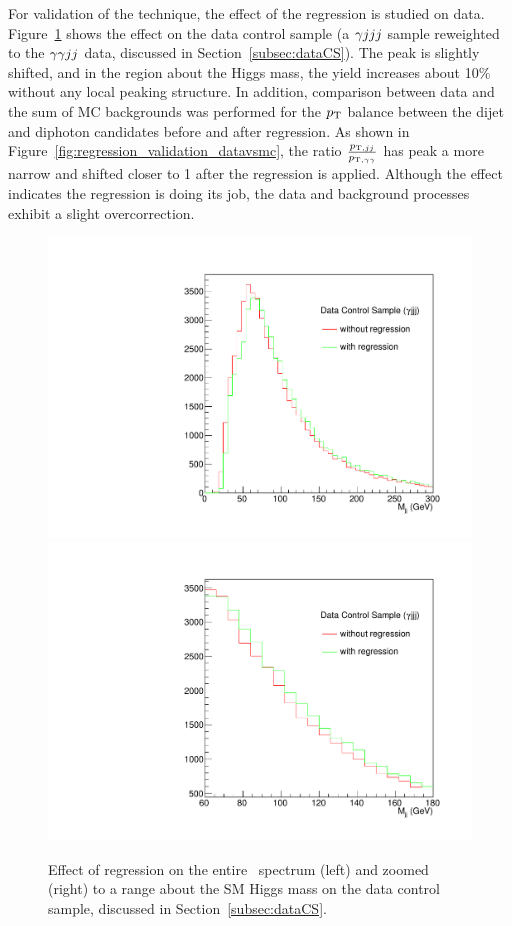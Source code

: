 For validation of the technique, the effect of the regression is studied on data.
Figure~\ref{fig:regression_plots_dataCS_mjj} shows the effect on the data control sample
(a $\gamma jjj$ sample reweighted to the $\gamma\gamma jj$ data, discussed in Section~\ref{subsec:dataCS}). The peak
is slightly shifted, and in the region about the Higgs mass, the yield increases about 10\% without
any local peaking structure. 
In addition, comparison between data and the sum of MC backgrounds was performed for the $p_{\rm T}$
balance between the dijet and diphoton candidates before and after regression.
As shown in Figure~\ref{fig:regression_validation_datavsmc}, the ratio
$\frac{p_{{\rm T},jj}}{p_{{\rm T},\gamma\gamma}}$ has peak a more narrow and shifted closer
to 1 after the regression is applied. Although the effect indicates the regression is doing its job,
the data and background processes exhibit a slight overcorrection.

\begin{figure}[ht]
\begin{center}
\includegraphics[width=.4\textwidth]{figures/objects/dataCS_mjj.pdf}
\includegraphics[width=.4\textwidth]{figures/objects/dataCS_mjj_zoom.pdf}
\end{center}
\caption{Effect of regression on the entire \Mjj\, spectrum (left) and zoomed (right)
to a range about the SM Higgs mass on the data control sample, discussed in
Section~\ref{subsec:dataCS}.}
\label{fig:regression_plots_dataCS_mjj} 
\end{figure}

